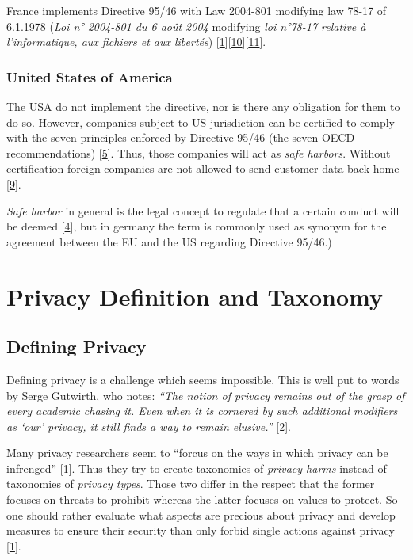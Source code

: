 France implements Directive 95/46 with Law 2004-801 modifying law 78-17 of 6.1.1978 (\emph{Loi n° 2004-801 du 6 août 2004} modifying \emph{loi n°78-17 relative à l'informatique, aux fichiers et aux libertés}) {[}\hyperref[references]{1}{]}{[}\hyperref[references]{10}{]}{[}\hyperref[references]{11}{]}.

\subsubsection*{United States of America}

The USA do not implement the directive, nor is there any obligation for them to do so.
However, companies subject to US jurisdiction can be certified to comply with the seven principles enforced by Directive 95/46 (the seven OECD recommendations) {[}\hyperref[references]{5}{]}.
Thus, those companies will act as \emph{safe harbors}. Without certification foreign companies are not allowed to send customer data back home {[}\hyperref[references]{9}{]}.

\emph{Safe harbor} in general is the legal concept to regulate that a certain conduct will be deemed {[}\hyperref[references]{4}{]}, but in germany the term is commonly used as synonym for the agreement between the EU and the US regarding Directive 95/46.)

\section{Privacy Definition and Taxonomy}

\subsection{Defining Privacy}

Defining privacy is a challenge which seems impossible. This is well put to words by Serge Gutwirth, who notes: \emph{``The notion of privacy remains out of the grasp of every academic chasing it. Even when it is cornered by such additional modifiers as `our' privacy, it still finds a way to remain elusive.''} {[}\hyperref[references]{2}{]}.

Many privacy researchers seem to ``forcus on the ways in which privacy can be infrenged'' {[}\hyperref[references]{1}{]}.
Thus they try to create taxonomies of \emph{privacy harms} instead of taxonomies of \emph{privacy types}.
Those two differ in the respect that the former focuses on threats to prohibit whereas the latter focuses on values to protect.
So one should rather evaluate what aspects are precious about privacy and develop measures to ensure their security than only forbid single actions against privacy {[}\hyperref[references]{1}{]}.

